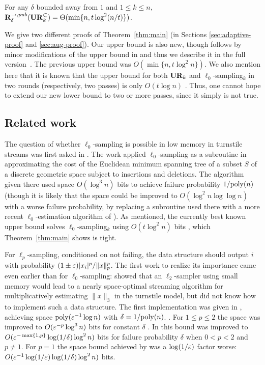 \begin{theorem}\label{thm:main}
For any $\delta$ bounded away from $1$ and $1\le k\le n$, $\mathbf{R}^{\rightarrow,pub}_\delta(\mathbf{UR}_k^\subset) = \Theta(\min\{n, t\log^2(n/t)\})$.
\end{theorem}

We give two different proofs of Theorem~\ref{thm:main} (in Sections \ref{sec:adaptive-proof} and \ref{sec:aug-proof}). Our upper bound is also new, though follows by minor modifications of the upper bound in \cite{JowhariST11} and thus we describe it in the full version~\cite{KapralovNPWWY17}. The previous upper bound was $O(\min\{n, t\log^2 n\})$. We also mention here that it is known that the upper bound for both $\mathbf{UR}_k$ and $\ell_0$-sampling$_k$ in two rounds (respectively, two passes) is only $O(t\log n)$ \cite{JowhariST11}. Thus, one cannot hope to extend our new lower bound to two or more passes, since it simply is not true.


\vspace{-.1in}\subsection{Related work}
The question of whether $\ell_0$-sampling is possible in low memory in turnstile streams was first asked in \cite{CormodeMR05,FrahlingIS08}. The work \cite{FrahlingIS08} applied $\ell_0$-sampling as a subroutine in approximating the cost of the Euclidean minimum spanning tree of a subset $S$ of a discrete geometric space subject to insertions and deletions. The algorithm given there used space $O(\log^3 n)$ bits to achieve failure probability $1/{\mathrm{poly}}(n)$ (though it is likely that the space could be improved to $O(\log^2 n\log\log n)$ with a worse failure probability, by replacing a subroutine used there with a more recent $\ell_0$-estimation algorithm of \cite{KaneNW10}). As mentioned, the currently best known upper bound solves $\ell_0$-sampling$_k$ using $O(t\log^2 n)$ bits \cite{JowhariST11}, which Theorem~\ref{thm:main} shows is tight.

For $\ell_p$-sampling, conditioned on not failing, the data structure should output $i$ with probability $(1\pm\varepsilon)|x_i|^p/\|x\|_p^p$. The first work to realize its importance came even earlier than for $\ell_0$-sampling: \cite{CoppersmithK04} showed that an $\ell_2$-sampler using small memory would lead to a nearly space-optimal streaming algorithm for multiplicatively estimating $\|x\|_3$ in the turnstile model, but did not know how to implement such a data structure. The first implementation was given in \cite{MonemizadehW10}, achieving space ${\mathrm{poly}}(\varepsilon^{-1}\log n)$ with $\delta = 1/{\mathrm{poly}}(n)$. . For $1\le p\le 2$ the space was improved to $O(\varepsilon^{-p}\log^3 n)$ bits for constant $\delta$ \cite{AndoniKO11}. In \cite{JowhariST11} this bound was improved to $O(\varepsilon^{-\max\{1,p\}}\log(1/\delta)\log^2 n)$ bits for failure probability $\delta$ when $0<p<2$ and $p\neq 1$. For $p=1$ the space bound achieved by \cite{JowhariST11} was a $\log(1/\varepsilon)$ factor worse: $O(\varepsilon^{-1}\log(1/\varepsilon)\log(1/\delta)\log^2 n)$ bits.

